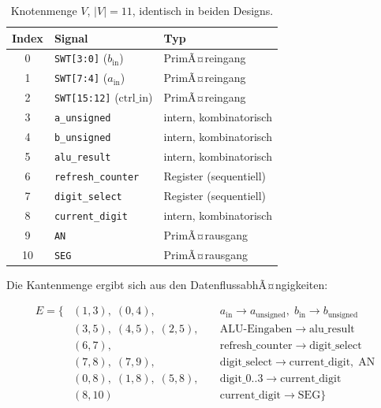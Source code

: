﻿\documentclass[12pt,a4paper]{report}
\begin{document}
\begin{table}[H]
	\centering
	\begin{tabular}{|c|l|l|}
		\hline
		\textbf{Index} & \textbf{Signal} & \textbf{Typ} \\
		\hline
		0 & \texttt{SWT[3:0]}  ($b_\mathrm{in}$)   & PrimÃ¤reingang \\
		1 & \texttt{SWT[7:4]}  ($a_\mathrm{in}$)   & PrimÃ¤reingang \\
		2 & \texttt{SWT[15:12]} ($\mathrm{ctrl\_in}$) & PrimÃ¤reingang \\
		3 & \texttt{a\_unsigned}                      & intern, kombinatorisch \\
		4 & \texttt{b\_unsigned}                      & intern, kombinatorisch \\
		5 & \texttt{alu\_result}                      & intern, kombinatorisch \\
		6 & \texttt{refresh\_counter}                 & Register (sequentiell) \\
		7 & \texttt{digit\_select}                    & Register (sequentiell) \\
		8 & \texttt{current\_digit}                   & intern, kombinatorisch \\
		9 & \texttt{AN}                               & PrimÃ¤rausgang \\
		10 & \texttt{SEG}                             & PrimÃ¤rausgang \\
		\hline
	\end{tabular}
	\caption{Knotenmenge $V$, $|V| = 11$, identisch in beiden Designs.}
	\label{tab:knoten_vv}
\end{table}

Die Kantenmenge ergibt sich aus den DatenflussabhÃ¤ngigkeiten:

\begin{align*}
	E = \{
	&(1, 3),\; (0, 4),\;                       && a_\mathrm{in} \to a_\mathrm{unsigned},\; b_\mathrm{in} \to b_\mathrm{unsigned}\\
	&(3, 5),\; (4, 5),\; (2, 5),\;             && \text{ALU-Eingaben} \to \mathrm{alu\_result}\\
	&(6, 7),\;                                 && \mathrm{refresh\_counter} \to \mathrm{digit\_select} \\
	&(7, 8),\; (7, 9),\;                       && \mathrm{digit\_select} \to \mathrm{current\_digit},\; \mathrm{AN}\\
	&(0, 8),\; (1, 8),\; (5, 8),\;             && \mathrm{digit\_0..3} \to \mathrm{current\_digit}\\
	&(8, 10)\;                                 && \mathrm{current\_digit} \to \mathrm{SEG}
	\}
\end{align*}
\end{document}
